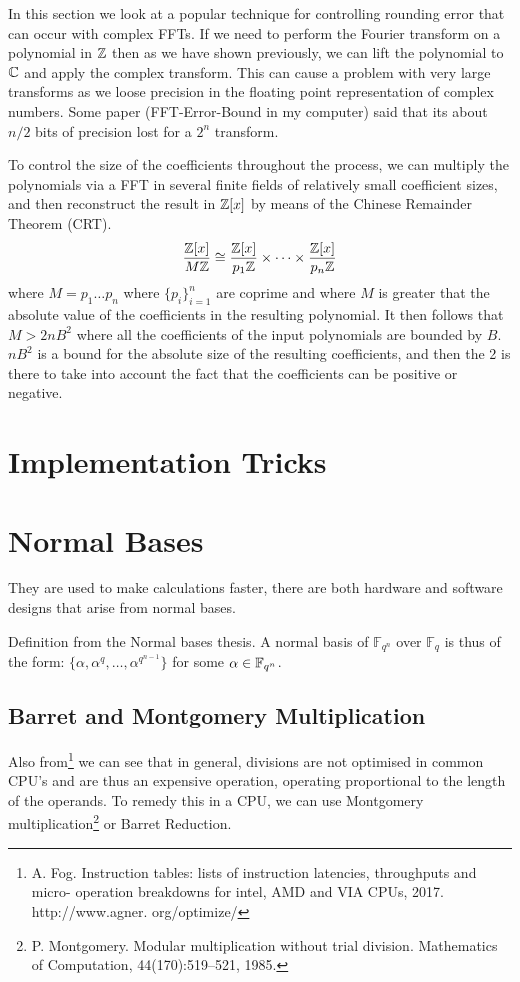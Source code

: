 In this section we look at a popular technique for controlling rounding error that can occur with complex FFTs. If we need to perform the Fourier transform on a polynomial in ${\mathbb Z}$ then as we have shown previously, we can lift the polynomial to $\mathbb{C}$ and apply the complex transform. This can cause a problem with very large transforms as we loose precision in the floating point representation of complex numbers. Some paper (FFT-Error-Bound in my computer) said that its about $n / 2$ bits of precision lost for a $2^n$ transform. 

To control the size of the coefficients throughout the process, we can multiply the polynomials via a FFT in several finite fields of relatively small coefficient sizes, and then reconstruct the result in ${\mathbb Z}[x]$ by means of the Chinese Remainder Theorem (CRT).
\[
    \frac{{\mathbb Z}[x]}{M{\mathbb Z}} \cong \frac{{\mathbb Z}[x]}{p_1{\mathbb Z}} \times \cdots \times \frac{{\mathbb Z}[x]}{p_n{\mathbb Z}}
\]
where $M = p_1 \ldots p_n$ where $\{p_i\}_{i=1}^n$ are coprime and where $M$ is greater that the absolute value of the coefficients in the resulting polynomial. It then follows that $M > 2nB^2$ where all the coefficients of the input polynomials are bounded by $B$. $nB^2$ is a bound for the absolute size of the resulting coefficients, and then the 2 is there to take into account the fact that the coefficients can be positive or negative.





\section{Implementation Tricks}
\label{sec:impl-tricks}

\section{Normal Bases}
They are used to make calculations faster, there are both hardware and software designs that arise from normal bases.

Definition from the Normal bases thesis.
A normal basis of $\mathbb{F}_{q^n}$ over $\mathbb{F}_q$ is thus of the form: $\{\alpha,\alpha^q,\ldots ,\alpha^{q^{n-1}}\}$ for some $\alpha \in \mathbb{F}_{q^n}$.

\subsection{Barret and Montgomery Multiplication}%
\label{sub:Barret and Montgomery Multiplication}

Also from\footnote{A. Fog. Instruction tables: lists of instruction latencies, throughputs and micro- operation breakdowns for intel, AMD and VIA CPUs, 2017. http://www.agner. org/optimize/} we can see that in general, divisions are not optimised in common CPU's and are thus an expensive operation, operating proportional to the length of the operands. To remedy this in a CPU, we can use Montgomery multiplication\footnote{P. Montgomery. Modular multiplication without trial division. Mathematics of Computation, 44(170):519–521, 1985.} or Barret Reduction.
